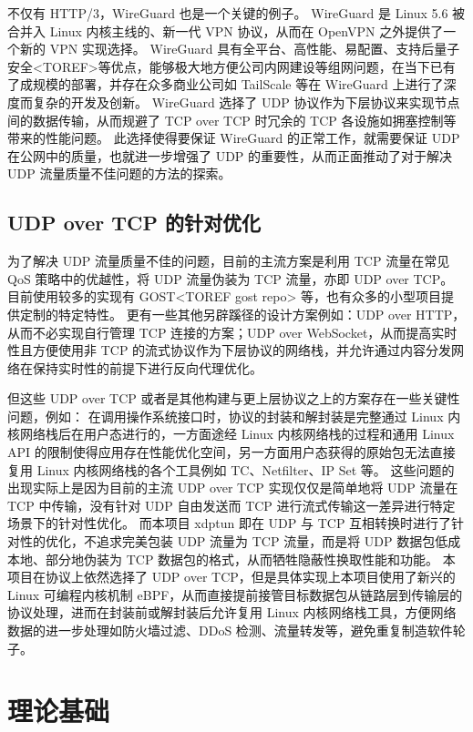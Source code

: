 不仅有 HTTP/3，WireGuard 也是一个关键的例子。
WireGuard 是 Linux 5.6 被合并入 Linux 内核主线的、新一代 VPN 协议，从而在 OpenVPN 之外提供了一个新的 VPN 实现选择。
WireGuard 具有全平台、高性能、易配置、支持后量子安全<TOREF>等优点，能够极大地方便公司内网建设等组网问题，在当下已有了成规模的部署，并存在众多商业公司如 TailScale 等在 WireGuard 上进行了深度而复杂的开发及创新。
WireGuard 选择了 UDP 协议作为下层协议来实现节点间的数据传输，从而规避了 TCP over TCP 时冗余的 TCP 各设施如拥塞控制等带来的性能问题。
此选择使得要保证 WireGuard 的正常工作，就需要保证 UDP 在公网中的质量，也就进一步增强了 UDP 的重要性，从而正面推动了对于解决 UDP 流量质量不佳问题的方法的探索。

\section{UDP over TCP 的针对优化}

为了解决 UDP 流量质量不佳的问题，目前的主流方案是利用 TCP 流量在常见 QoS 策略中的优越性，将 UDP 流量伪装为 TCP 流量，亦即 UDP over TCP。
目前使用较多的实现有 GOST<TOREF gost repo> 等，也有众多的小型项目提供定制的特定特性。
更有一些其他另辟蹊径的设计方案例如：UDP over HTTP，从而不必实现自行管理 TCP 连接的方案；UDP over WebSocket，从而提高实时性且方便使用非 TCP 的流式协议作为下层协议的网络栈，并允许通过内容分发网络在保持实时性的前提下进行反向代理优化。

但这些 UDP over TCP 或者是其他构建与更上层协议之上的方案存在一些关键性问题，例如：
在调用操作系统接口时，协议的封装和解封装是完整通过 Linux 内核网络栈后在用户态进行的，一方面途经 Linux 内核网络栈的过程和通用 Linux API 的限制使得应用存在性能优化空间，另一方面用户态获得的原始包无法直接复用 Linux 内核网络栈的各个工具例如 TC、Netfilter、IP Set 等。
这些问题的出现实际上是因为目前的主流 UDP over TCP 实现仅仅是简单地将 UDP 流量在 TCP 中传输，没有针对 UDP 自由发送而 TCP 进行流式传输这一差异进行特定场景下的针对性优化。
而本项目 xdptun 即在 UDP 与 TCP 互相转换时进行了针对性的优化，不追求完美包装 UDP 流量为 TCP 流量，而是将 UDP 数据包低成本地、部分地伪装为 TCP 数据包的格式，从而牺牲隐蔽性换取性能和功能。
本项目在协议上依然选择了 UDP over TCP，但是具体实现上本项目使用了新兴的 Linux 可编程内核机制 eBPF，从而直接提前接管目标数据包从链路层到传输层的协议处理，进而在封装前或解封装后允许复用 Linux 内核网络栈工具，方便网络数据的进一步处理如防火墙过滤、DDoS 检测、流量转发等，避免重复制造软件轮子。

\chapter{理论基础}

